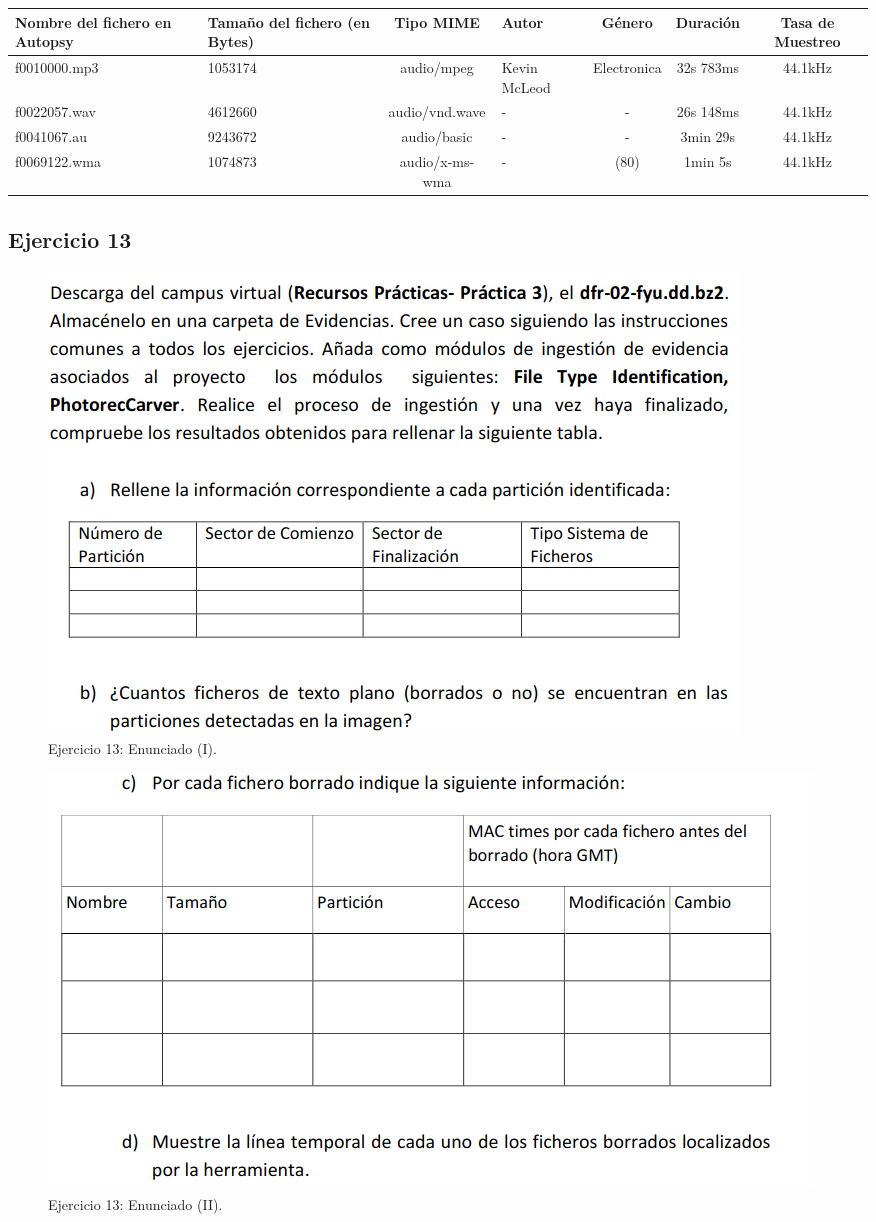 \documentclass[11pt]{article}
\begin{document}
\begin{table}[H]
    \centering
    \begin{tabular}{|p{2.5cm}|p{2cm}|c|p{1.5cm}|c|c|c|}
        \hline
        Nombre del fichero en Autopsy & Tamaño del fichero (en Bytes) & Tipo MIME & Autor & Género & Duración & Tasa de Muestreo \\
        \hline\hline
        f0010000.mp3 & 1053174 & audio/mpeg & Kevin McLeod & Electronica & 32s 783ms & 44.1kHz \\
        \hline
        f0022057.wav & 4612660 & audio/vnd.wave & - & - & 26s 148ms & 44.1kHz \\
        \hline
        f0041067.au & 9243672 & audio/basic & - & - & 3min 29s & 44.1kHz \\
        \hline
        f0069122.wma & 1074873 & audio/x-ms-wma & - & (80) & 1min 5s & 44.1kHz \\
        \hline
    \end{tabular}
\end{table}

\subsection{Ejercicio 13}

\begin{figure}[H]
    \caption{Ejercicio 13: Enunciado (I).}
  \centering
  \includegraphics[scale=0.7]{other/enunciado_p03_e13-1.png}
\end{figure}

\begin{figure}[H]
    \caption{Ejercicio 13: Enunciado (II).}
  \centering
  \includegraphics[scale=0.7]{other/enunciado_p03_e13-2.png}
\end{figure}
\end{document}
